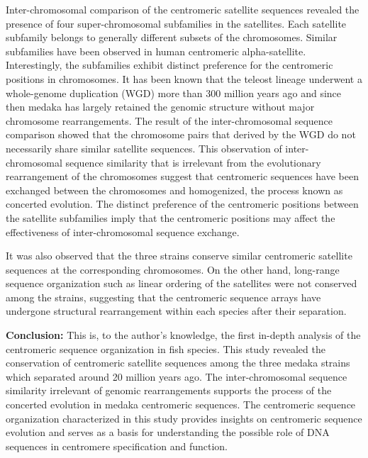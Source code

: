 Inter-chromosomal comparison of the centromeric satellite sequences revealed the presence of four super-chromosomal subfamilies in the satellites. Each satellite subfamily belongs to generally different subsets of the chromosomes. Similar subfamilies have been observed in human centromeric alpha-satellite. Interestingly, the subfamilies exhibit distinct preference for the centromeric positions in chromosomes. It has been known that the teleost lineage underwent a whole-genome duplication (WGD) more than 300 million years ago and since then medaka has largely retained the genomic structure without major chromosome rearrangements. The result of the inter-chromosomal sequence comparison showed that the chromosome pairs that derived by the WGD do not necessarily share similar satellite sequences. This observation of inter-chromosomal sequence similarity that is irrelevant from the evolutionary rearrangement of the chromosomes suggest that centromeric sequences have been exchanged between the chromosomes and homogenized, the process known as concerted evolution. The distinct preference of the centromeric positions between the satellite subfamilies imply that the centromeric positions may affect the effectiveness of inter-chromosomal sequence exchange.

It was also observed that the three strains conserve similar centromeric satellite sequences at the corresponding chromosomes. On the other hand, long-range sequence organization such as linear ordering of the satellites were not conserved among the strains, suggesting that the centromeric sequence arrays have undergone structural rearrangement within each species after their separation.

\vspace{0.7cm}
\noindent\textbf{Conclusion:} This is, to the author's knowledge, the first in-depth analysis of the centromeric sequence organization in fish species. This study revealed the conservation of centromeric satellite sequences among the three medaka strains which separated around 20 million years ago. The inter-chromosomal sequence similarity irrelevant of genomic rearrangements supports the process of the concerted evolution in medaka centromeric sequences. The centromeric sequence organization characterized in this study provides insights on centromeric sequence evolution and serves as a basis for understanding the possible role of DNA sequences in centromere specification and function.
